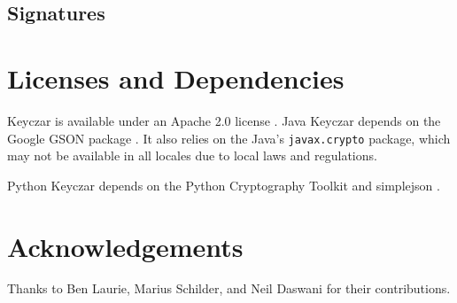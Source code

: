 \documentclass{llncs}
\begin{document}
\subsection{Signatures}

\section{Licenses and Dependencies}

Keyczar is available under an Apache 2.0 license \cite{apache2}. Java Keyczar
depends on the Google GSON package \cite{google-gson}. It also relies on the
Java's {\tt javax.crypto} package, which may not be available in  all locales
due to local laws and regulations.

Python Keyczar depends on the Python Cryptography Toolkit \cite{python-crypto}
and simplejson \cite{simplejson}. 

\section{Acknowledgements}

Thanks to Ben Laurie, Marius Schilder, and Neil Daswani for their
contributions.



\end{document}
